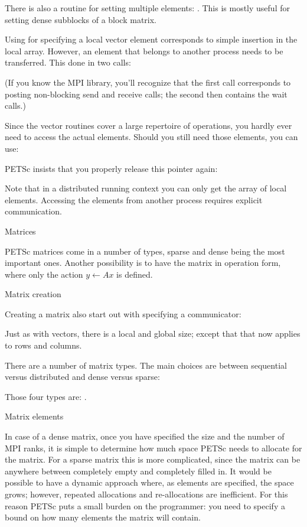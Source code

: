 There is also a routine for setting multiple elements:
. This is mostly useful for setting dense subblocks of
a block matrix.

Using  for specifying a local vector element
corresponds to simple insertion in the local array. However,
an element that belongs to another process needs to be
transferred. This done in two calls:
%

(If you know the MPI library, you'll recognize that the first call corresponds to
posting non-blocking send and receive calls; the second then contains
the wait calls.)

Since the vector routines cover a large repertoire of operations, you
hardly ever need to access the actual elements. Should you still need
those elements, you can use:
%

PETSc insists that you properly release this pointer again:


Note that in a distributed running context you can only get the array
of local elements. Accessing the elements from another process
requires explicit communication.

 {Matrices}

PETSc matrices come in a number of types, sparse and dense being the
most important ones. Another possibility is to have the matrix in
operation form, where only the action $y\leftarrow Ax$ is defined.

 {Matrix creation}

Creating a matrix also start out with specifying a communicator:
%

Just as with vectors, there is a local and global size; except that
that now applies to rows and columns.
%
%

There are a number of matrix types. The main choices are between
sequential versus distributed and dense versus sparse:
%

Those four types are:    .

 {Matrix elements}

In case of a dense matrix, once you have specified the size and the
number of MPI ranks, it is simple to determine how much space PETSc
needs to allocate for the matrix. For a sparse matrix this is more
complicated, since the matrix can be anywhere between completely empty
and completely filled in. It would be possible to have a dynamic
approach where, as elements are specified, the space grows; however,
repeated allocations and re-allocations are inefficient. For this
reason PETSc puts a small burden on the programmer: you need to
specify a bound on how many elements the matrix will contain.

